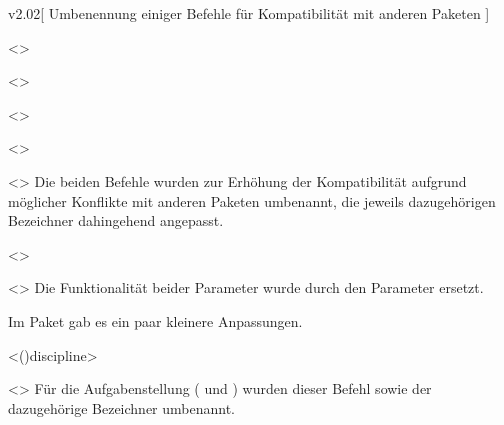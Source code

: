 \begin{Entity}{}
\begin{NoIndexDefault}
\begin{Cessations}{v2.02}[%
  Umbenennung einiger Befehle für Kompatibilität mit anderen Paketen%
]
\begin{Cessation}
  {}
  <>
\begin{Cessation}
  {}
  <>
\begin{Cessation}
  {}
  <>
\begin{Cessation}
  {}
  <>
\begin{Cessation}
  {}
  <>
\printdeclarationlist
%
Die beiden Befehle wurden zur Erhöhung der Kompatibilität aufgrund möglicher 
Konflikte mit anderen Paketen umbenannt, die jeweils dazugehörigen Bezeichner 
dahingehend angepasst.
\end{Cessation}
\end{Cessation}
\end{Cessation}
\end{Cessation}
\end{Cessation}

\begin{Declaration*}
  {}
\begin{Cessation}
  {}
  <>
\begin{Cessation}
  {}
  <>
\printdeclarationlist
%
Die Funktionalität beider Parameter wurde durch den Parameter 
 ersetzt.
\end{Cessation}
\end{Cessation}
\end{Declaration*}



%
\begin{Entity}{}
Im Paket  gab es ein paar kleinere Anpassungen.
\begin{Cessation}
  {}
  <\Macro(){discipline}>
\begin{Cessation}
  {}
  <>
\printdeclarationlist
%
Für die Aufgabenstellung ( und ) wurden 
dieser Befehl sowie der dazugehörige Bezeichner umbenannt.
\end{Cessation}
\end{Cessation}


\end{Entity}
\end{Cessations}
\end{NoIndexDefault}
\end{Entity}
